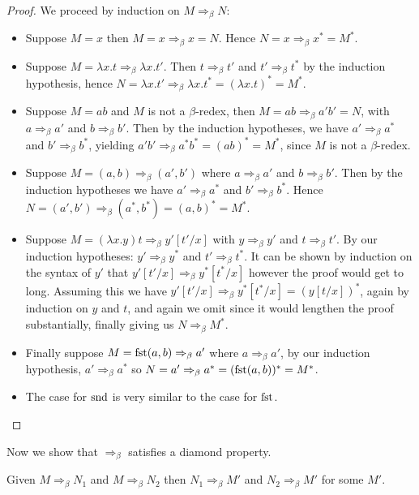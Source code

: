 \begin{proof}
    We proceed by induction on $M \Rightarrow_\beta N$:
    \begin{itemize}
        \item Suppose $M = x$ then $M = x \Rightarrow_\beta x = N$. Hence $N = x \Rightarrow_\beta x^* = M^*$.
        \item Suppose $M = \lambda x . t \Rightarrow_\beta \lambda x . t'$. Then $t \Rightarrow_\beta t'$ and $t' \Rightarrow_\beta t^*$ by the induction hypothesis, hence $N = \lambda x . t' \Rightarrow_\beta \lambda x . t^* = (\lambda x . t)^* = M^*$.
        \item Suppose $M = a b$ and $M$ is not a $\beta$-redex, then $M = a b \Rightarrow_\beta a ' b ' = N$, with $a \Rightarrow_\beta a'$ and $b \Rightarrow_\beta b'$. Then by the induction hypotheses, we have $a' \Rightarrow_\beta a^*$ and $b' \Rightarrow_\beta b^*$, yielding $a' b' \Rightarrow_\beta a^* b^* = (a b)^*=M^*$, since $M$ is not a $\beta$-redex.
        \item Suppose $M = (a, b) \Rightarrow_\beta (a' , b')$ where $a \Rightarrow_\beta a'$ and $b \Rightarrow_\beta b'$. Then by the induction hypotheses we have $a' \Rightarrow_\beta a^*$ and $b' \Rightarrow_\beta b^*$. Hence $N = (a', b') \Rightarrow_\beta (a^*, b^*) = (a, b)^* = M^*$.
        \item Suppose $M = (\lambda x . y) t \Rightarrow_\beta y'[t'/x]$ with $y \Rightarrow_\beta y'$ and $t \Rightarrow_\beta t'$. By our induction hypotheses: $y' \Rightarrow_\beta y^*$ and $t' \Rightarrow_\beta t^*$. It can be shown by induction on the syntax of $y'$ that $y'[t'/x] \Rightarrow_\beta y^*[t^* / x]$ however the proof would get to long. Assuming this we have $y' [t'/x] \Rightarrow_\beta y^*[t^* / x] = (y[t/x])^*$, again by induction on $y$ and $t$, and again we omit since it would lengthen the proof substantially, finally giving us $N \Rightarrow_\beta M^*$.
        \item Finally suppose $M = \mathrm{fst}(a, b) \Rightarrow_\beta a'$ where $a \Rightarrow_\beta a'$, by our induction hypothesis, $a' \Rightarrow_\beta a^*$ so $N = a' \Rightarrow_\beta a^* = (\mathrm{fst}(a, b))^* = M^*$.
        \item The case for $\mathrm{snd}$ is very similar to the case for $\mathrm{fst}$.
    \end{itemize}
\end{proof}

Now we show that $\Rightarrow_\beta$ satisfies a diamond property.

\begin{cor}\label{diamond_par_beta}
    Given $M \Rightarrow_\beta N_1$ and $M \Rightarrow_\beta N_2$ then $N_1 \Rightarrow_\beta M'$ and $N_2 \Rightarrow_\beta M'$ for some $M'$.
\end{cor}

